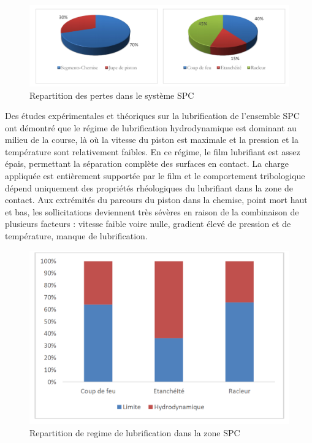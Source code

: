 \begin{figure}[h]
	\centering
	\includegraphics[width=0.7\linewidth]{"Img/Repartition des pertes mecanique"}
	\caption[Repartition des pertes dans le SPC]{Repartition des pertes dans le système SPC}
	\label{fig:repartition-des-pertes-mecanique}
\end{figure}
Des études expérimentales et théoriques sur la lubrification de l'ensemble SPC ont démontré que le régime de lubrification hydrodynamique est dominant au milieu de la course, là où la vitesse du piston est maximale et la pression et la température sont relativement faibles. En ce régime, le film lubrifiant est assez épais, permettant la séparation complète des surfaces en contact. La charge appliquée est entièrement supportée par le film et le comportement tribologique dépend uniquement des propriétés rhéologiques du lubrifiant dans la zone de contact. Aux extrémités du parcours du piston dans la chemise, point mort haut et bas, les sollicitations deviennent très sévères en raison de la combinaison de plusieurs facteurs : vitesse faible voire nulle, gradient élevé de pression et de température, manque de lubrification.\cite{Amal}\\

\begin{figure}[h]
	\centering
	\includegraphics[width=0.7\linewidth]{"Img/repartition de regime de lubrification"}
	\caption[Repartition de regime de lubrification]{Repartition de regime de lubrification dans la zone SPC}
	\label{fig:repartition-de-regime-de-lubrification}
\end{figure}

